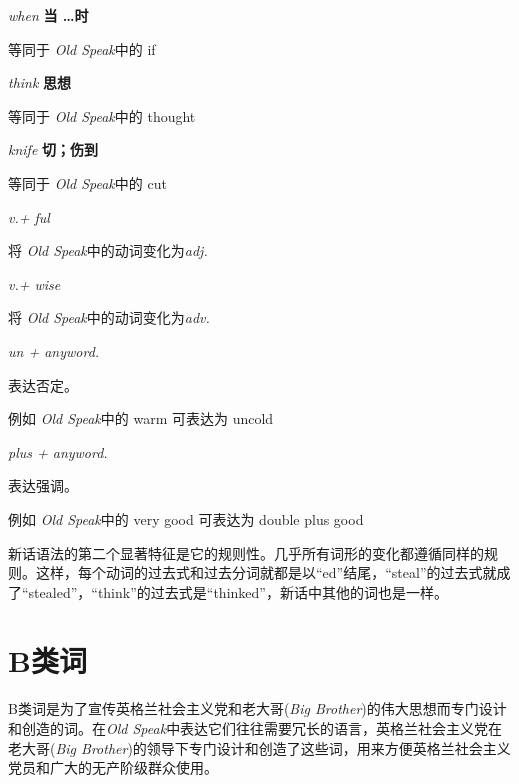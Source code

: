 \documentclass[lang=cn, color=black, chinesefont=founder]{elegantbook}
\newenvironment{word}[2]{
    \noindent \textit{#1} \quad \textbf{#2} \\
    \indent
}{}
\newcommand{\os}{\textit{Old Speak}}
\newcommand{\eos}[1]{等同于 \os 中的 #1}
\newcommand{\vocab}{\textit{v.}}
\newcommand{\adj}{\textit{adj.}}
\newcommand{\adv}{\textit{adv.}}
\newcommand{\anyword}{\textit{anyword.}}
\newcommand{\ingsoc}{英格兰社会主义党}
\newcommand{\bb}{老大哥(\textit{Big Brother})}
\begin{document}
                \begin{multicols}{2}
                    \begin{word}{when}{当 \dots 时}
                        \eos{if}
                    \end{word}
    
                    \begin{word}{think}{思想}
                        \eos{thought}
                    \end{word}
    
                    \begin{word}{knife}{切；伤到}
                        \eos{cut}
                    \end{word}
    
                    \begin{word}{\vocab + ful}{}
                        将 \os 中的动词变化为\adj
                    \end{word}

                    \begin{word}{\vocab + wise}{}
                        将 \os 中的动词变化为\adv
                    \end{word}

                    \begin{word}{un + \anyword}{}
                        表达否定。
                        
                        例如 \os 中的 warm 可表达为 uncold
                    \end{word}

                    \begin{word}{plus + \anyword}{}
                        表达强调。
                        
                        例如 \os 中的 very good 可表达为 double plus good
                    \end{word}
                \end{multicols}

                新话语法的第二个显著特征是它的规则性。几乎所有词形的变化都遵循同样的规则。这样，每个动词的过去式和过去分词就都是以“ed”结尾，“steal”的过去式就成了“stealed”，“think”的过去式是“thinked”，新话中其他的词也是一样。
            
            \section{B类词}
                B类词是为了宣传\ingsoc 和\bb 的伟大思想而专门设计和创造的词。在\os 中表达它们往往需要冗长的语言，\ingsoc 在\bb 的领导下专门设计和创造了这些词，用来方便\ingsoc 员和广大的无产阶级群众使用。
\end{document}

